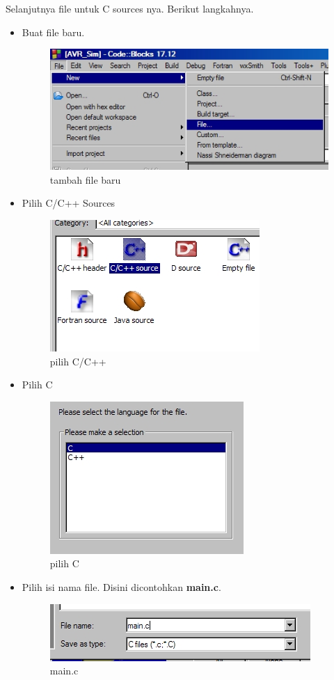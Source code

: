\documentclass[12pt,]{article}
\begin{document}
	Selanjutnya file untuk C sources nya.
	Berikut langkahnya.
	\begin{itemize}
		\item Buat file baru.
		\begin{figure}[H]
			\centering
			\includegraphics[width=0.5\linewidth]{images/hello_a9}
			\caption{tambah file baru}
		\end{figure}

		\item Pilih C/C++ Sources
		\begin{figure}[H]
			\centering
			\includegraphics[width=0.5\linewidth]{images/hello_a10}
			\caption{pilih C/C++}
		\end{figure}
	
		\item Pilih C
		\begin{figure}[H]
			\centering
			\includegraphics[width=0.5\linewidth]{images/hello_a11}
			\caption{pilih C}
		\end{figure}
	
		\newpage
		\item Pilih isi nama file.
		Disini dicontohkan \textbf{main.c}.
		\begin{figure}[H]
			\centering
			\includegraphics[width=0.5\linewidth]{images/hello_a12}
			\caption{main.c}
		\end{figure}
	

\end{itemize}
\end{document}
